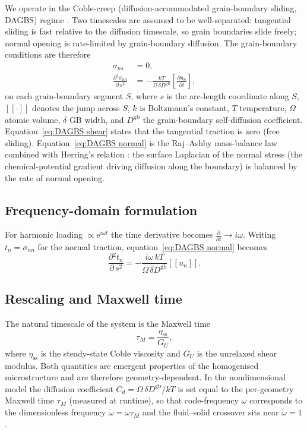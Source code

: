 \documentclass[12pt]{article}
\newcommand{\pd}[2]{\frac{\partial{#1}}{\partial{#2}}}
\newcommand{\e}{\text{e}}
\newcommand{\jump}[1]{[\![#1]\!]}
\begin{document}
We operate in the Coble-creep (diffusion-accommodated grain-boundary sliding, DAGBS) regime \citep{raj_grain_1971, rudge_viscoelastic_2025}. Two timescales are assumed to be well-separated: tangential sliding is fast relative to the diffusion timescale, so grain boundaries slide freely; normal opening is rate-limited by grain-boundary diffusion. The grain-boundary conditions are therefore
\begin{align}
    \sigma_{ns} &= 0, \label{eq:DAGBS shear} \\
    \pd{^2 \sigma_{nn}}{\,s^2} &= -\frac{kT}{\Omega\,\delta D^{\mathrm{gb}}}\left[\pd{u_n}{t}\right], \label{eq:DAGBS normal}
\end{align}
on each grain-boundary segment $S$, where $s$ is the arc-length coordinate along $S$, $\jump{\cdot}$ denotes the jump across $S$, $k$ is Boltzmann's constant, $T$ temperature, $\Omega$ atomic volume, $\delta$ GB width, and $D^{\mathrm{gb}}$ the grain-boundary self-diffusion coefficient. Equation~\eqref{eq:DAGBS shear} states that the tangential traction is zero (free sliding). Equation~\eqref{eq:DAGBS normal} is the Raj--Ashby mass-balance law \citep{raj_grain_1971} combined with Herring's relation \citep{herring_diffusional_1950}: the surface Laplacian of the normal stress (the chemical-potential gradient driving diffusion along the boundary) is balanced by the rate of normal opening.

\subsection{Frequency-domain formulation}

For harmonic loading $\propto \e^{i\omega t}$ the time derivative becomes $\pd{}{t} \to i\omega$. Writing $t_n = \sigma_{nn}$ for the normal traction, equation~\eqref{eq:DAGBS normal} becomes
\begin{equation}
    \pd{^2 t_n}{\,s^2} = -\frac{i\omega\,kT}{\Omega\,\delta D^{\mathrm{gb}}}\jump{u_n}. \label{eq:diff-fd}
\end{equation}

\subsection{Rescaling and Maxwell time}

The natural timescale of the system is the Maxwell time
\begin{equation}
    \tau_M = \frac{\eta_{\mathrm{ss}}}{G_U}, \label{eq:maxwell time}
\end{equation}
where $\eta_{\mathrm{ss}}$ is the steady-state Coble viscosity and $G_U$ is the unrelaxed shear modulus. Both quantities are emergent properties of the homogenised microstructure and are therefore geometry-dependent. In the nondimensional model the diffusion coefficient $C_d = \Omega\,\delta D^{\mathrm{gb}} / kT$ is set equal to the per-geometry Maxwell time $\tau_M$ (measured at runtime), so that code-frequency $\omega$ corresponds to the dimensionless frequency $\tilde{\omega} = \omega\tau_M$ and the fluid--solid crossover sits near $\tilde{\omega} = 1$.
\end{document}
